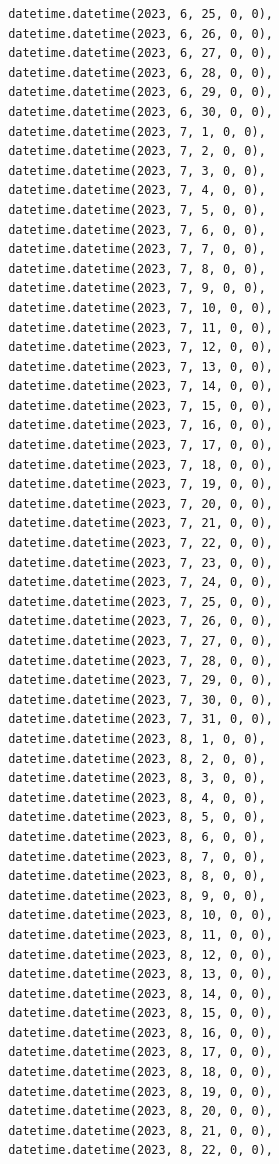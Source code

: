\documentclass[
  letterpaper,
  DIV=11,
  numbers=noendperiod,
  oneside]{scrreprt}
\begin{document}
\begin{verbatim}
       datetime.datetime(2023, 6, 25, 0, 0),
       datetime.datetime(2023, 6, 26, 0, 0),
       datetime.datetime(2023, 6, 27, 0, 0),
       datetime.datetime(2023, 6, 28, 0, 0),
       datetime.datetime(2023, 6, 29, 0, 0),
       datetime.datetime(2023, 6, 30, 0, 0),
       datetime.datetime(2023, 7, 1, 0, 0),
       datetime.datetime(2023, 7, 2, 0, 0),
       datetime.datetime(2023, 7, 3, 0, 0),
       datetime.datetime(2023, 7, 4, 0, 0),
       datetime.datetime(2023, 7, 5, 0, 0),
       datetime.datetime(2023, 7, 6, 0, 0),
       datetime.datetime(2023, 7, 7, 0, 0),
       datetime.datetime(2023, 7, 8, 0, 0),
       datetime.datetime(2023, 7, 9, 0, 0),
       datetime.datetime(2023, 7, 10, 0, 0),
       datetime.datetime(2023, 7, 11, 0, 0),
       datetime.datetime(2023, 7, 12, 0, 0),
       datetime.datetime(2023, 7, 13, 0, 0),
       datetime.datetime(2023, 7, 14, 0, 0),
       datetime.datetime(2023, 7, 15, 0, 0),
       datetime.datetime(2023, 7, 16, 0, 0),
       datetime.datetime(2023, 7, 17, 0, 0),
       datetime.datetime(2023, 7, 18, 0, 0),
       datetime.datetime(2023, 7, 19, 0, 0),
       datetime.datetime(2023, 7, 20, 0, 0),
       datetime.datetime(2023, 7, 21, 0, 0),
       datetime.datetime(2023, 7, 22, 0, 0),
       datetime.datetime(2023, 7, 23, 0, 0),
       datetime.datetime(2023, 7, 24, 0, 0),
       datetime.datetime(2023, 7, 25, 0, 0),
       datetime.datetime(2023, 7, 26, 0, 0),
       datetime.datetime(2023, 7, 27, 0, 0),
       datetime.datetime(2023, 7, 28, 0, 0),
       datetime.datetime(2023, 7, 29, 0, 0),
       datetime.datetime(2023, 7, 30, 0, 0),
       datetime.datetime(2023, 7, 31, 0, 0),
       datetime.datetime(2023, 8, 1, 0, 0),
       datetime.datetime(2023, 8, 2, 0, 0),
       datetime.datetime(2023, 8, 3, 0, 0),
       datetime.datetime(2023, 8, 4, 0, 0),
       datetime.datetime(2023, 8, 5, 0, 0),
       datetime.datetime(2023, 8, 6, 0, 0),
       datetime.datetime(2023, 8, 7, 0, 0),
       datetime.datetime(2023, 8, 8, 0, 0),
       datetime.datetime(2023, 8, 9, 0, 0),
       datetime.datetime(2023, 8, 10, 0, 0),
       datetime.datetime(2023, 8, 11, 0, 0),
       datetime.datetime(2023, 8, 12, 0, 0),
       datetime.datetime(2023, 8, 13, 0, 0),
       datetime.datetime(2023, 8, 14, 0, 0),
       datetime.datetime(2023, 8, 15, 0, 0),
       datetime.datetime(2023, 8, 16, 0, 0),
       datetime.datetime(2023, 8, 17, 0, 0),
       datetime.datetime(2023, 8, 18, 0, 0),
       datetime.datetime(2023, 8, 19, 0, 0),
       datetime.datetime(2023, 8, 20, 0, 0),
       datetime.datetime(2023, 8, 21, 0, 0),
       datetime.datetime(2023, 8, 22, 0, 0),

\end{verbatim}
\end{document}
